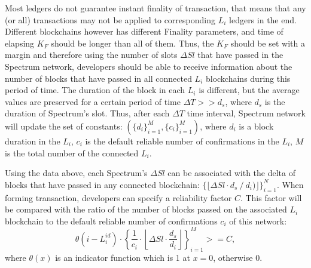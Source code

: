 Most ledgers do not guarantee instant finality of transaction, that means that any (or all) transactions may not be applied to corresponding $L_i$ ledgers in the end.
Different blockchains however has different Finality parameters, and time of elapsing $K_F$ should be longer than all of them.
Thus, the $K_F$ should be set with a margin and therefore using the number of slots $\Delta Sl$ that have passed in the Spectrum network, developers should be able to receive information about the number of blocks that have passed in all connected $L_i$ blockchains during this period of time.
The duration of the block in each $L_i$ is different, but the average values are preserved for a certain period of time ${\Delta T >> d_s}$, where $d_s$ is the duration of Spectrum's slot.
Thus, after each $\Delta T$ time interval, Spectrum network will update the set of constants: ${(\{d_{i}\}_{i=1}^{M},\{c_{i}\}_{i=1}^{M})}$, where $d_i$ is a block duration in the $L_i$, $c_i$ is the default reliable number of confirmations in the $L_i$, $M$ is the total number of the connected $L_i$.

Using the data above, each Spectrum's $\Delta Sl$ can be associated with the delta of blocks that have passed in any connected blockchain: ${\{\lfloor \Delta Sl \cdot d_s \mathbin{/} d_i)\rfloor\}_{i=1}^{N}}$.
When forming transaction, developers can specify a reliability factor $C$.
This factor will be compared with the ratio of the number of blocks passed on the associated $L_i$ blockchain to the default reliable number of confirmations $c_i$ of this network:
\begin{equation}
    \theta(i-L_i^{id})\cdot \left\{\frac{1}{c_i} \cdot \left\lfloor \Delta Sl \cdot \frac{d_s}{d_i}\right\rfloor\right\}_{i=1}^{M} >= C,\label{eq:equation2}
\end{equation}
where $\theta(x)$ is an indicator function which is 1 at $x = 0$, otherwise 0.
